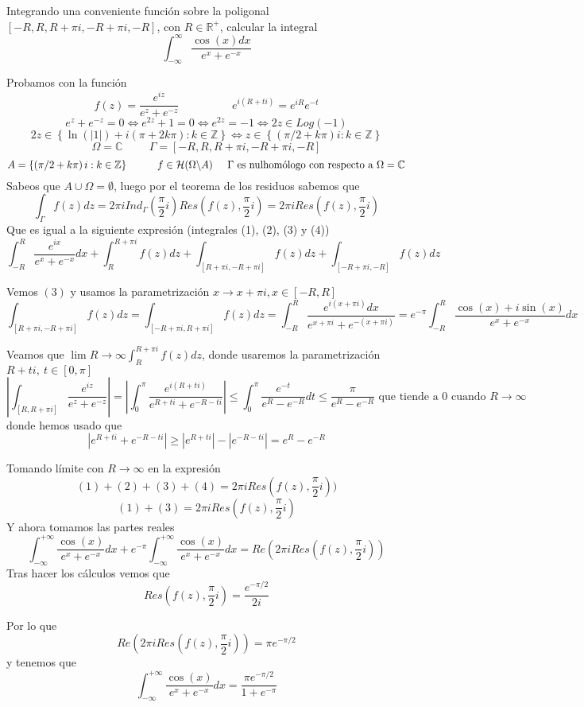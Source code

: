 \begin{ejer}
	Integrando una conveniente función sobre la poligonal $[-R,R,R+\pi i,-R+\pi i, -R]$, con $R\in\mathbb{R}^+$, calcular la integral
	$$ \int_{-\infty}^{\infty} \frac{\cos(x)dx}{e^x+e^{-x}} $$
\end{ejer}
\begin{sol}


Probamos con la función
$$ f(z) = \frac{e^{iz}}{e^z+e^{-z}} \hspace{2cm} e^{i(R+ti)} = e^{iR}e^{-t} $$
$$ e^z+e^{-z} =0\Longleftrightarrow  e^{2z}+1=0 \Longleftrightarrow e^{2z}=-1 \Longleftrightarrow 2z\in Log(-1) $$
$$ 2z\in\left\{ \ln(|1|) + i(\pi+2k\pi) : k\in\mathbb{Z} \right\} \Longleftrightarrow z\in\left\{ (\pi/2+k\pi)i : k\in\mathbb{Z} \right\} $$
$$ \Omega=\mathbb{C} \hspace{1cm} \Gamma = [ -R,R,R+\pi i, -R+\pi i, -R ] $$
$$ A = \left\{ \left( \pi/2 +k\pi \right)i : k\in\mathbb{Z} \right\} \hspace{1cm} f\in\mathcal{H}(\Omega\backslash A) \hspace{0.5cm} \Gamma \text{ es nulhomólogo con respecto a }\Omega=\mathbb{C} $$
Sabeos que $A\cup\Omega = \emptyset$, luego por el teorema de los residuos sabemos que
$$ \int_{\Gamma} f(z)dz = 2\pi iInd_{\Gamma}(\frac{\pi}{2}i) Res(f(z), \frac{\pi}{2}i) = 2\pi i Res(f(z), \frac{\pi}{2}i)$$
Que es igual a la siguiente expresión (integrales (1), (2), (3) y (4))
$$ \int_{-R}^{R} \frac{e^{ix}}{e^x+e^{-x}} dx + \int_{R}^{R+\pi i} f(z)dz + \int_{[R+\pi i,-R+\pi i]} f(z)dz + \int_{[-R+\pi i, -R]} f(z)dz $$

Vemos $(3)$ y usamos la parametrización $x\rightarrow x+\pi i, x\in[-R,R]$
$$ \int_{[R+\pi i,-R+\pi i]} f(z)dz = \int_{[-R+\pi i,R+\pi i]} f(z)dz = \int_{-R}^{R} \frac{e^{i(x+\pi i)}dx}{e^{x+\pi i}+e^{-(x+\pi i)}} = e^{-\pi} \int_{-R}^{R} \frac{\cos(x)+i\sin(x)}{e^x+e^{-x}}dx $$

Veamos que $\lim{R\rightarrow\infty} \int_{R}^{R+\pi i} f(z)dz$, donde usaremos la parametrización $R+ti, \ t\in[0,\pi]$
$$ \left| \int_{[R,R+\pi i]} \frac{e^{iz}}{e^z+e^{-z}} \right|  = \left| \int_{0}^{\pi} \frac{e^{i(R+ti)}}{e^{R+ti}+e^{-R-ti}} \right| \leq \int_{0}^{\pi} \frac{e^{-t}}{e^R-e^{-R}}dt \leq \frac{\pi}{e^R-e^{-R}} \text{ que tiende a $0$ cuando $R \rightarrow\infty$}$$
donde hemos usado que
$$ | e^{R+ti}+e^{-R-ti} | \geq |e^{R+ti}|-|e^{-R-ti}| = e^R-e^{-R} $$

Tomando límite con $R\rightarrow\infty$ en la expresión
$$ (1)+(2)+(3)+(4) = 2\pi i Res(f(z),\frac{\pi}{2}i)) $$
$$ (1)+(3) = 2\pi iRes(f(z),\frac{\pi}{2}i) $$
Y ahora tomamos las partes reales
$$ \int_{-\infty}^{+\infty} \frac{\cos(x)}{e^x+e^{-x}} dx + e^{-\pi} \int_{-\infty}^{+\infty} \frac{\cos(x)}{e^x+e^{-x}}dx = Re(2\pi iRes(f(z), \frac{\pi}{2}i)) $$
Tras hacer los cálculos vemos que
$$ Res(f(z),\frac{\pi}{2}i) = \frac{e^{-\pi/2}}{2i}  $$

Por lo que 
$$ Re(2\pi iRes(f(z), \frac{\pi}{2}i)) = \pi e^{-\pi/2} $$
y tenemos que
$$ \int_{-\infty}^{+\infty} \frac{\cos(x)}{e^x+e^{-x}} dx = \frac{\pi e^{-\pi/2}}{1+e^{-\pi}} $$
\end{sol}



